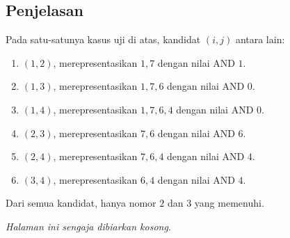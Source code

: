 \documentclass{article}
\begin{document}
\subsection*{Penjelasan}
Pada satu-satunya kasus uji di atas, kandidat $(i, j)$ antara lain:

\begin{enumerate}
    \setlength\itemsep{0pt}
    \item $(1, 2)$, merepresentasikan $1, 7$ dengan nilai AND $1$.
    \item $(1, 3)$, merepresentasikan $1, 7, 6$ dengan nilai AND $0$.
    \item $(1, 4)$, merepresentasikan $1, 7, 6, 4$ dengan nilai AND $0$.
    \item $(2, 3)$, merepresentasikan $7, 6$ dengan nilai AND $6$.
    \item $(2, 4)$, merepresentasikan $7, 6, 4$ dengan nilai AND $4$.
    \item $(3, 4)$, merepresentasikan $6, 4$ dengan nilai AND $4$.
\end{enumerate}

Dari semua kandidat, hanya nomor $2$ dan $3$ yang memenuhi.

\newpage
\vspace*{\fill}
\begin{center}
    \textit{Halaman ini sengaja dibiarkan kosong.}
\end{center}
\vspace*{\fill}
\end{document}
